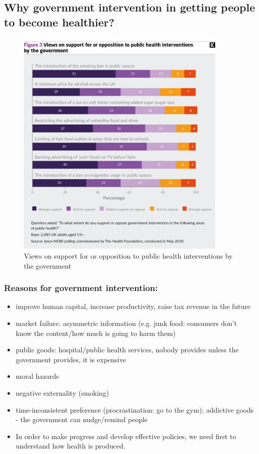 \subsection{Why government intervention in getting people to become healthier?}
        \begin{figure}[H]%
                \centering
                \includegraphics[width=4in]{images/ch3/22.png}
                \caption{Views on support for or opposition to public health interventions by the government}
            \end{figure}

\subsubsection{Reasons for government intervention:}          
\begin{itemize}           
        \item improve human capital, increase productivity, raise tax revenue in the future
        \item market failure: asymmetric information (e.g. junk food: consumers don't know the content/how much is going to harm them)
        \item public goods: hospital/public health services, nobody provides unless the government provides, it is expensive
        \item moral hazards
        \item negative externality (smoking)
        \item time-inconsistent preference (procrastination: go to the gym); addictive goods - the government can nudge/remind people
        \item In order to make progress and develop effective policies, we need first to understand how health is produced.
\end{itemize} 


